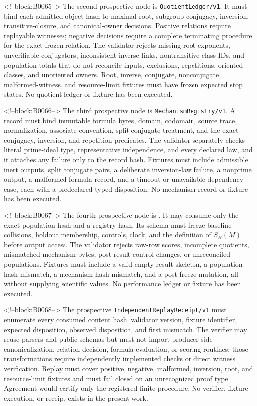 \documentclass[11pt,a4paper]{article}
\begin{document}
<!--block:B0065-->
The second prospective node is \texttt{QuotientLedger/v1}. It must bind each admitted object hash to maximal-root, subgroup-conjugacy, inversion, transitive-closure, and canonical-owner decisions. Positive relations require replayable witnesses; negative decisions require a complete terminating procedure for the exact frozen relation. The validator rejects missing root exponents, unverifiable conjugators, inconsistent inverse links, nontransitive class IDs, and population totals that do not reconcile inputs, exclusions, repetitions, oriented classes, and unoriented owners. Root, inverse, conjugate, nonconjugate, malformed-witness, and resource-limit fixtures must have frozen expected stop states. No quotient ledger or fixture has been executed.

<!--block:B0066-->
The third prospective node is \texttt{MechanismRegistry/v1}. A record must bind immutable formula bytes, domain, codomain, source trace, normalization, associate convention, split-conjugate treatment, and the exact conjugacy, inversion, and repetition predicates. The validator separately checks literal prime-ideal type, representative independence, and every declared law, and it attaches any failure only to the record hash. Fixtures must include admissible inert outputs, split conjugate pairs, a deliberate inversion-law failure, a nonprime output, a malformed formula record, and a timeout or unavailable-dependency case, each with a predeclared typed disposition. No mechanism record or fixture has been executed.

<!--block:B0067-->
The fourth prospective node is . It may consume only the exact  population hash and a  registry hash. Its schema must freeze baseline collisions, holdout membership, controls, clock, and the definition of \(S_H(M)\) before output access. The validator rejects raw-row scores, incomplete quotients, mismatched mechanism bytes, post-result control changes, or unreconciled populations. Fixtures must include a valid empty-result skeleton, a population-hash mismatch, a mechanism-hash mismatch, and a post-freeze mutation, all without supplying scientific values. No performance ledger or fixture has been executed.

<!--block:B0068-->
The prospective \texttt{IndependentReplayReceipt/v1} must enumerate every consumed content hash, validator version, fixture identifier, expected disposition, observed disposition, and first mismatch. The verifier may reuse parsers and public schemas but must not import producer-side canonicalization, relation-decision, formula-evaluation, or scoring routines; those transformations require independently implemented checks or direct witness verification. Replay must cover positive, negative, malformed, inversion, root, and resource-limit fixtures and must fail closed on an unrecognized proof type. Agreement would certify only the registered finite procedure. No verifier, fixture execution, or receipt exists in the present work.
\end{document}
